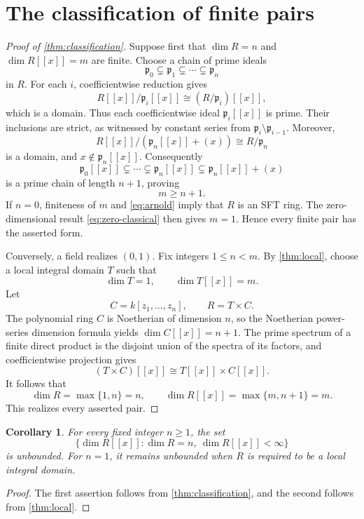 \documentclass[11pt,reqno]{amsart}
\numberwithin{equation}{section}
\theoremstyle{plain}
\newtheorem{corollary}[theorem]{Corollary}
\theoremstyle{definition}
\theoremstyle{remark}
\newcommand{\p}{\mathfrak p}
\begin{document}
\section{The classification of finite pairs}\label{sec:classification}

\begin{proof}[Proof of \cref{thm:classification}]
Suppose first that $\dim R=n$ and $\dim R[[x]]=m$ are finite.
Choose a chain of prime ideals
\[
  \p_0\subsetneq\p_1\subsetneq\cdots\subsetneq\p_n
\]
in $R$.  For each $i$, coefficientwise reduction gives
\[
  R[[x]]/\p_i[[x]]\cong (R/\p_i)[[x]],
\]
which is a domain.  Thus each coefficientwise ideal $\p_i[[x]]$
is prime.  Their inclusions are strict, as witnessed by constant
series from $\p_i\setminus\p_{i-1}$.  Moreover,
\[
  R[[x]]/(\p_n[[x]]+(x))\cong R/\p_n
\]
is a domain, and $x\notin\p_n[[x]]$.  Consequently
\[
  \p_0[[x]]\subsetneq\cdots\subsetneq\p_n[[x]]
  \subsetneq\p_n[[x]]+(x)
\]
is a prime chain of length $n+1$, proving
\begin{equation}\label{eq:necessary-lower-bound}
  m\ge n+1.
\end{equation}
If $n=0$, finiteness of $m$ and \cref{eq:arnold} imply that $R$
is an SFT ring.  The zero-dimensional result
\cref{eq:zero-classical} then gives $m=1$.  Hence every finite
pair has the asserted form.

Conversely, a field realizes $(0,1)$.  Fix integers
$1\le n<m$.  By \cref{thm:local}, choose a local integral domain
$T$ such that
\[
  \dim T=1,\qquad \dim T[[x]]=m.
\]
Let
\[
  C=k[z_1,\ldots,z_n],\qquad R=T\times C.
\]
The polynomial ring $C$ is Noetherian of dimension $n$, so the
Noetherian power-series dimension formula yields
$\dim C[[x]]=n+1$.  The prime spectrum of a finite direct
product is the disjoint union of the spectra of its factors,
and coefficientwise projection gives
\[
  (T\times C)[[x]]\cong T[[x]]\times C[[x]].
\]
It follows that
\[
  \dim R=\max\{1,n\}=n,\qquad
  \dim R[[x]]=\max\{m,n+1\}=m.
\]
This realizes every asserted pair.
\end{proof}

\begin{corollary}\label{cor:no-finite-upper-bound}
For every fixed integer $n\ge1$, the set
\[
  \bigl\{\dim R[[x]]:\dim R=n,\ \dim R[[x]]<\infty\bigr\}
\]
is unbounded.  For $n=1$, it remains unbounded when $R$ is
required to be a local integral domain.
\end{corollary}

\begin{proof}
The first assertion follows from \cref{thm:classification},
and the second follows from \cref{thm:local}.
\end{proof}
\end{document}
